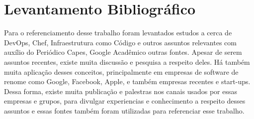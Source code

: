 \section{Levantamento Bibliográfico}

Para o referenciamento desse trabalho foram levantados estudos a cerca de DevOps, Chef, Infraestrutura como Código e outros assuntos relevantes com auxílio do Periódico Capes, Google Acadêmico  outras fontes. Apesar de serem assuntos recentes, existe muita discussão e pesquisa a respeito deles. Há também muita aplicação desses conceitos, principalmente em empresas de software de renome como Google, Facebook, Apple, e também empresas recentes e start-ups. Dessa forma, existe muita publicação e palestras nos canais usados por essas empresas e grupos, para divulgar experiencias e conhecimento a respeito desses assuntos e essas fontes também foram utilizadas para referenciar esse trabalho. 
